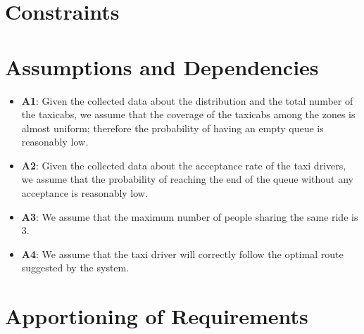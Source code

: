 \section{Constraints}

\section{Assumptions and Dependencies} \label{assump}
\begin{itemize}
	\item \textbf{A1}: Given the collected data about the distribution and the total number of the taxicabs, we assume that the coverage of the taxicabs among the zones is almost uniform; therefore the probability of having an empty queue is reasonably low.
	\item \textbf{A2}: Given the collected data about the acceptance rate of the taxi drivers, we assume that the probability of reaching the end of the queue without any acceptance is reasonably low.
	\item \textbf{A3}: We assume that the maximum number of people sharing the same ride is 3.
	\item \textbf{A4}: We assume that the taxi driver will correctly follow the optimal route suggested by the system.
\end{itemize}


\section{Apportioning of Requirements}